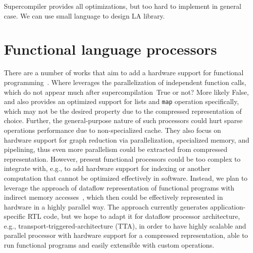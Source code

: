 \documentclass[10pt,conference]{IEEEtran}
\newcommand\todo[1]{{\color{red}#1}}
\begin{document}
Supercompiler provides all optimizations, but too hard to implement in general case. 
We can use small language to design LA library.

\section{Functional language processors}
There are a number of works that aim to add a hardware support for functional programming~\cite{ACqua,Reduceron,PILGRIM}. Where \cite{ACqua} leverages the parallelization of independent function calls, which do not appear much after supercompilation~\todo{True or not? More likely False}, and also
provides an optimized support for lists and \texttt{map} operation specifically, which may not be the desired property due to the compressed representation of choice. Further, the general-purpose nature of such processors could hurt sparse operations performance due to non-specialized cache.
They also focus on hardware support for graph reduction via parallelization, specialized memory, and pipelining, thus even more parallelism could be extracted from compressed representation.
However, present functional processors could be too complex to integrate with, e.g., to add hardware support for indexing or another computation that cannot be optimized effectively in software. 
Instead, we plan to leverage the approach of dataflow representation of functional programs with indirect memory accesses~\cite{funcHLS}, which then could be effectively represented in hardware in a highly parallel way. 
The approach currently generates application-specific RTL code, but we hope to adapt it for dataflow processor architecture, e.g., transport-triggered-architecture (TTA), in order to have highly scalable and parallel processor with hardware support for a compressed representation, able to run functional programs and easily extensible with custom operations. 


\end{document}
